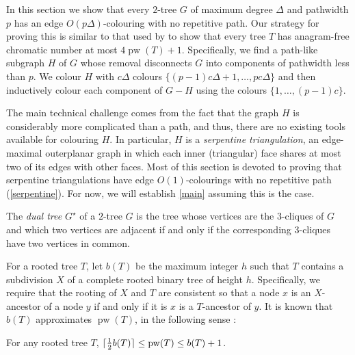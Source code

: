 \documentclass[kpfonts]{patmorin}
\DeclareMathOperator{\pw}{pw}
\begin{document}
In this section we show that every $2$-tree $G$ of maximum degree $\Delta$ and pathwidth $p$ has an edge $O(p\Delta)$-colouring with no repetitive path.  Our strategy for proving this is similar to that used by \citet{wilson.wood:anagram-free} to show that every tree $T$ has anagram-free chromatic number at most $4\pw(T)+1$.  Specifically, we find a path-like subgraph $H$ of $G$ whose removal disconnects $G$ into components of pathwidth less than $p$.  We colour $H$ with $c\Delta$ colours $\{(p-1)c\Delta+1,\ldots,pc\Delta\}$ and then inductively colour each component of $G-H$ using the colours $\{1,\ldots,(p-1)c\}$.

The main technical challenge comes from the fact that the graph $H$ is considerably more complicated than a path, and thus, there are no existing tools available for colouring $H$.  In particular, $H$ is a \emph{serpentine triangulation}, an edge-maximal outerplanar graph in which each inner (triangular) face shares at most two of its edges with other faces. Most of this section is devoted to proving that serpentine triangulations have edge $O(1)$-colourings with no repetitive path (\cref{serpentine}).  For now, we will establish \cref{main} assuming this is the case.

The \emph{dual tree} $G^\star$ of a $2$-tree $G$ is the tree whose vertices are the $3$-cliques of $G$ and which two vertices are adjacent if and only if the corresponding $3$-cliques have two vertices in common.

For a rooted tree $T$, let $b(T)$ be the maximum integer $h$ such that $T$ contains a subdivision $X$ of a complete rooted binary tree of height $h$.  Specifically, we require that the rooting of $X$ and $T$ are consistent so that a node $x$ is an $X$-ancestor of a node $y$ if and only if it is $x$ is a $T$-ancestor of $y$.  It is known that $b(T)$ approximates $\pw(T)$, in the following sense \cite{X}:

\begin{lem}\label{b_approx}
    For any rooted tree $T$, $\ceil{\tfrac{1}{2}b(T)} \le \pw(T) \le b(T)+1$.
\end{lem}
\end{document}
